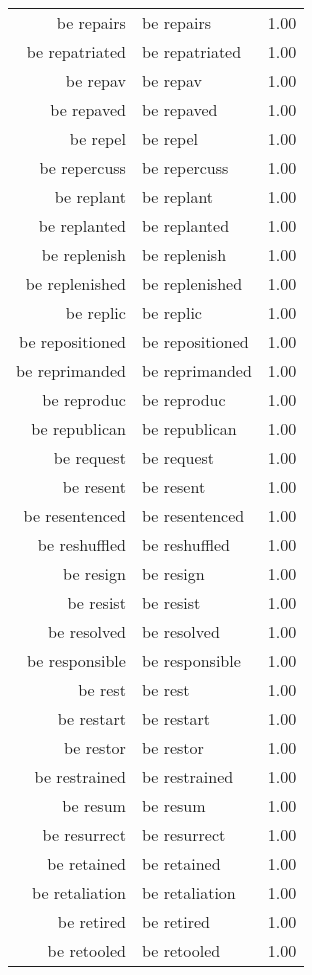 \begin{table}[ht]
\begin{tabular}{rlr}
  be repairs & be repairs & 1.00 \\ 
  be repatriated & be repatriated & 1.00 \\ 
  be repav & be repav & 1.00 \\ 
  be repaved & be repaved & 1.00 \\ 
  be repel & be repel & 1.00 \\ 
  be repercuss & be repercuss & 1.00 \\ 
  be replant & be replant & 1.00 \\ 
  be replanted & be replanted & 1.00 \\ 
  be replenish & be replenish & 1.00 \\ 
  be replenished & be replenished & 1.00 \\ 
  be replic & be replic & 1.00 \\ 
  be repositioned & be repositioned & 1.00 \\ 
  be reprimanded & be reprimanded & 1.00 \\ 
  be reproduc & be reproduc & 1.00 \\ 
  be republican & be republican & 1.00 \\ 
  be request & be request & 1.00 \\ 
  be resent & be resent & 1.00 \\ 
  be resentenced & be resentenced & 1.00 \\ 
  be reshuffled & be reshuffled & 1.00 \\ 
  be resign & be resign & 1.00 \\ 
  be resist & be resist & 1.00 \\ 
  be resolved & be resolved & 1.00 \\ 
  be responsible & be responsible & 1.00 \\ 
  be rest & be rest & 1.00 \\ 
  be restart & be restart & 1.00 \\ 
  be restor & be restor & 1.00 \\ 
  be restrained & be restrained & 1.00 \\ 
  be resum & be resum & 1.00 \\ 
  be resurrect & be resurrect & 1.00 \\ 
  be retained & be retained & 1.00 \\ 
  be retaliation & be retaliation & 1.00 \\ 
  be retired & be retired & 1.00 \\ 
  be retooled & be retooled & 1.00 \\ 

\end{tabular}
\end{table}
